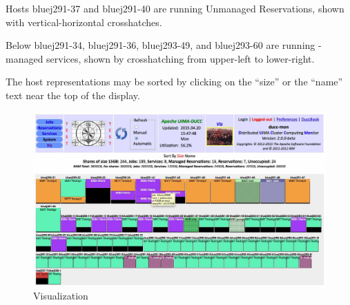        Hosts bluej291-37 and bluej291-40 are running Unmanaged Reservations, shown with
       vertical-horizontal crosshatches.

       Below bluej291-34, bluej291-36, bluej293-49, and bluej293-60 are running {\DUCC}-managed
       services, shown by crosshatching from upper-left to lower-right.

       The host representations may be sorted by clicking on the ``size'' or the ``name'' text
       near the top of the display.


           \begin{figure}[ht!]
    \centering
    \includegraphics[width=160mm]{images/ducc-webserver/viz.jpg}
    \caption{Visualization}
    \end{figure}

